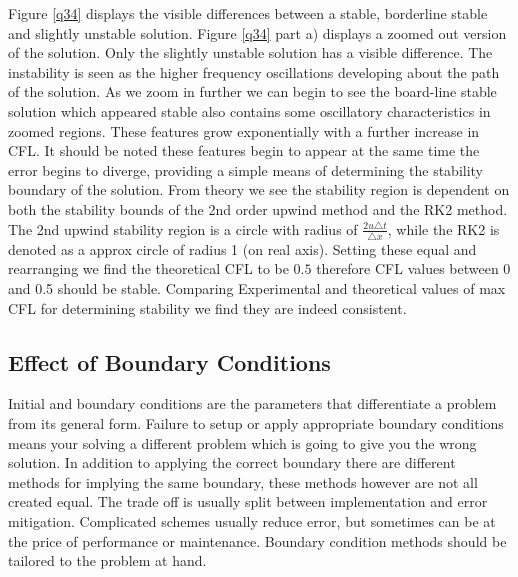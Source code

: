 \documentclass[paper=a4, fontsize=11pt, abstract=on]{scrartcl}
\numberwithin{equation}{section}		%
\numberwithin{figure}{section}			%
\numberwithin{table}{section}				%
\begin{document}
Figure \ref{q34} displays the visible differences between a stable, borderline stable and slightly unstable solution. Figure \ref{q34} part a) displays a zoomed out version of the solution. Only the slightly unstable solution has a visible difference. The instability is seen as the higher frequency oscillations developing about the path of the solution. As we zoom in further we can begin to see the board-line stable solution which appeared stable also contains some oscillatory characteristics in zoomed regions. These features grow exponentially with a further increase in CFL. It should be noted these features begin to appear at the same time the error begins to diverge, providing a simple means of determining the stability boundary of the solution. From theory we see the stability region is dependent on both the stability bounds of the 2nd order upwind method and the RK2 method. The 2nd upwind stability region is a circle with radius of $\frac{2u\triangle t}{\triangle x}$, while the RK2 is denoted as a approx circle of radius 1 (on real axis). Setting these equal and rearranging we find the theoretical CFL to be $0.5$ therefore CFL values between 0 and 0.5 should be stable. Comparing Experimental and theoretical values of max CFL for determining stability we find they are indeed consistent.

\subsection{Effect of Boundary Conditions}
Initial and boundary conditions are the parameters that differentiate a problem from its general form. Failure to setup or apply appropriate boundary conditions means your solving a different problem which is going to give you the wrong solution. In addition to applying the correct boundary there are different methods for implying the same boundary, these methods however are not all created equal. The trade off is usually split between implementation and error mitigation. Complicated schemes usually reduce error, but sometimes can be at the price of performance or maintenance. Boundary condition methods should be tailored to the problem at hand. 
\end{document}
